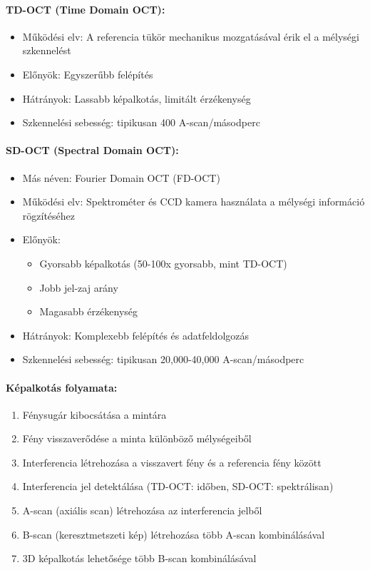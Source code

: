 \documentclass[a4paper,12pt]{article}
\begin{document}
\paragraph{TD-OCT (Time Domain OCT):} \begin{itemize} \item Működési elv: A referencia tükör mechanikus mozgatásával érik el a mélységi szkennelést \item Előnyök: Egyszerűbb felépítés \item Hátrányok: Lassabb képalkotás, limitált érzékenység \item Szkennelési sebesség: tipikusan 400 A-scan/másodperc \end{itemize}

\paragraph{SD-OCT (Spectral Domain OCT):} \begin{itemize} \item Más néven: Fourier Domain OCT (FD-OCT) \item Működési elv: Spektrométer és CCD kamera használata a mélységi információ rögzítéséhez \item Előnyök: \begin{itemize} \item Gyorsabb képalkotás (50-100x gyorsabb, mint TD-OCT) \item Jobb jel-zaj arány \item Magasabb érzékenység \end{itemize} \item Hátrányok: Komplexebb felépítés és adatfeldolgozás \item Szkennelési sebesség: tipikusan 20,000-40,000 A-scan/másodperc \end{itemize}

\paragraph{Képalkotás folyamata:} \begin{enumerate} \item Fénysugár kibocsátása a mintára \item Fény visszaverődése a minta különböző mélységeiből \item Interferencia létrehozása a visszavert fény és a referencia fény között \item Interferencia jel detektálása (TD-OCT: időben, SD-OCT: spektrálisan) \item A-scan (axiális scan) létrehozása az interferencia jelből \item B-scan (keresztmetszeti kép) létrehozása több A-scan kombinálásával \item 3D képalkotás lehetősége több B-scan kombinálásával \end{enumerate}
\end{document}

